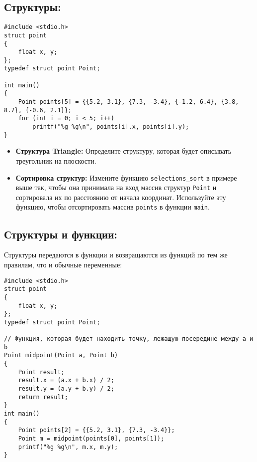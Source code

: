 \documentclass{article}
\begin{document}
\subsection*{Структуры:}
\begin{lstlisting}
#include <stdio.h>
struct point
{
	float x, y;
};
typedef struct point Point;

int main()
{
	Point points[5] = {{5.2, 3.1}, {7.3, -3.4}, {-1.2, 6.4}, {3.8, 8.7}, {-0.6, 2.1}};
	for (int i = 0; i < 5; i++)
		printf("%g %g\n", points[i].x, points[i].y);
}
\end{lstlisting}
\begin{itemize}
\item \textbf{Структура Triangle:} Определите структуру, которая будет описывать треугольник на плоскости.
\item \textbf{Сортировка структур:} Измените функцию \texttt{selections\_sort} в примере выше так, чтобы она принимала на вход массив структур \texttt{Point} и сортировала их по расстоянию от начала координат. Используйте эту функцию, чтобы отсортировать массив \texttt{points} в функции \texttt{main}.
\end{itemize}


\subsection*{Структуры и функции:}
Структуры передаются в функции и возвращаются из функций по тем же правилам, что и обычные переменные:
\begin{lstlisting}
#include <stdio.h>
struct point
{
	float x, y;
};
typedef struct point Point;

// Функция, которая будет находить точку, лежащую посередине между a и b
Point midpoint(Point a, Point b)
{
	Point result;
	result.x = (a.x + b.x) / 2;
	result.y = (a.y + b.y) / 2;
	return result;
}
int main()
{
	Point points[2] = {{5.2, 3.1}, {7.3, -3.4}};
	Point m = midpoint(points[0], points[1]);
	printf("%g %g\n", m.x, m.y);
}
\end{lstlisting}
\end{document}

